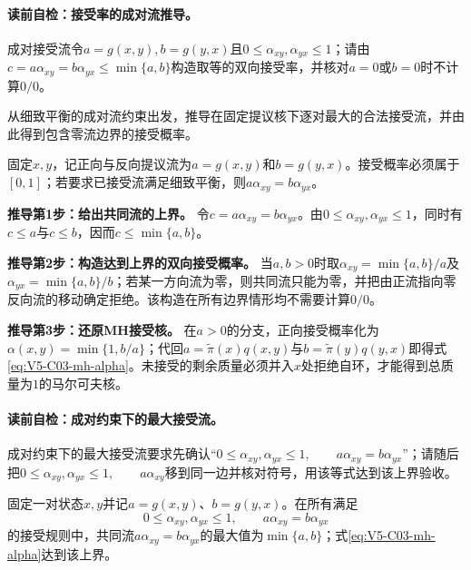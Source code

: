 \paragraph{读前自检：接受率的成对流推导。}成对接受流令$a=g(x,y),b=g(y,x)$且$0\le\alpha_{xy},\alpha_{yx}\le1$；请由$c=a\alpha_{xy}=b\alpha_{yx}\le\min\{a,b\}$构造取等的双向接受率，并核对$a=0$或$b=0$时不计算$0/0$。\par

\begin{derivationgoalbox}
从细致平衡的成对流约束出发，推导在固定提议核下逐对最大的合法接受流，并由此得到包含零流边界的\MetropolisHastings{}接受概率。
\end{derivationgoalbox}
\begin{derivationprepbox}
固定$x,y$，记正向与反向提议流为$a=g(x,y)$和$b=g(y,x)$。接受概率必须属于$[0,1]$；若要求已接受流满足细致平衡，则$a\alpha_{xy}=b\alpha_{yx}$。
\end{derivationprepbox}
\textbf{推导第1步：给出共同流的上界。}
令$c=a\alpha_{xy}=b\alpha_{yx}$。由$0\leq\alpha_{xy},\alpha_{yx}\leq1$，同时有$c\leq a$与$c\leq b$，因而$c\leq\min\{a,b\}$。

\textbf{推导第2步：构造达到上界的双向接受概率。}
当$a,b>0$时取$\alpha_{xy}=\min\{a,b\}/a$及$\alpha_{yx}=\min\{a,b\}/b$；若某一方向流为零，则共同流只能为零，并把由正流指向零反向流的移动确定拒绝。该构造在所有边界情形均不需要计算$0/0$。

\textbf{推导第3步：还原MH接受核。}
在$a>0$的分支，正向接受概率化为$\alpha(x,y)=\min\{1,b/a\}$；代回$a=\widetilde\pi(x)q(x,y)$与$b=\widetilde\pi(y)q(y,x)$即得式\eqref{eq:V5-C03-mh-alpha}。未接受的剩余质量必须并入$x$处拒绝自环，才能得到总质量为$1$的马尔可夫核。

\paragraph{读前自检：成对约束下的最大接受流。}成对约束下的最大接受流要求先确认“$0\le\alpha_{xy},\alpha_{yx}\le1, \qquad a\alpha_{xy}=b\alpha_{yx}$”；请随后把$0\le\alpha_{xy},\alpha_{yx}\le1, \qquad a\alpha_{xy}$移到同一边并核对符号，用该等式达到该上界验收。\par

\begin{proposition}[成对约束下的最大接受流]\label{prop:V5-C03-maximal-flow}
固定一对状态$x,y$并记$a=g(x,y)$、$b=g(y,x)$。在所有满足
\[
0\le\alpha_{xy},\alpha_{yx}\le1,
\qquad a\alpha_{xy}=b\alpha_{yx}
\]
的接受规则中，共同流$a\alpha_{xy}=b\alpha_{yx}$的最大值为$\min\{a,b\}$；式\eqref{eq:V5-C03-mh-alpha}达到该上界。
\end{proposition}
